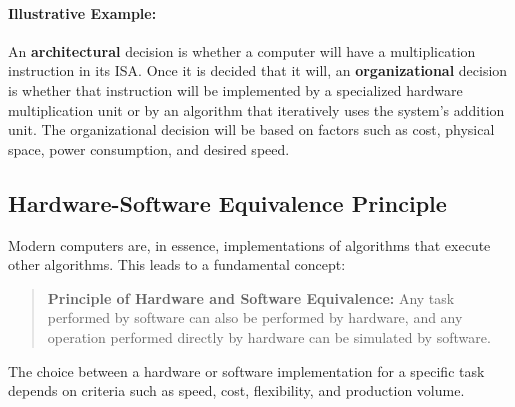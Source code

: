 \paragraph{Illustrative Example:}
An \textbf{architectural} decision is whether a computer will have a multiplication instruction in its ISA. Once it is decided that it will, an \textbf{organizational} decision is whether that instruction will be implemented by a specialized hardware multiplication unit or by an algorithm that iteratively uses the system's addition unit. The organizational decision will be based on factors such as cost, physical space, power consumption, and desired speed.

\subsection{Hardware-Software Equivalence Principle}
Modern computers are, in essence, implementations of algorithms that execute other algorithms. This leads to a fundamental concept:

\begin{quote}
    \textbf{Principle of Hardware and Software Equivalence:} Any task performed by software can also be performed by hardware, and any operation performed directly by hardware can be simulated by software.
\end{quote}

The choice between a hardware or software implementation for a specific task depends on criteria such as speed, cost, flexibility, and production volume.

